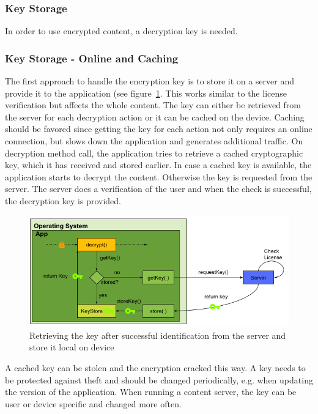 \subsubsection{Key Storage} \label{section:counter-replace-encryption-key}
In order to use encrypted content, a decryption key is needed.

\subsubsection{Key Storage - Online and Caching} \label{section:counter-replace-encryption-key-online}
The first approach to handle the encryption key is to store it on a server and provide it to the application (see figure~\ref{fig:encryptionKeyServer}.
This works similar to the license verification but affects the whole content.
\newline
The key can either be retrieved from the server for each decryption action or it can be cached on the device.
Caching should be favored since getting the key for each action not only requires an online connection, but slows down the application and generates additional traffic.
\newline
On decryption method call, the application tries to retrieve a cached cryptographic key, which it has received and stored earlier.
In case a cached key is available, the application starts to decrypt the content.
Otherwise the key is requested from the server.
The server does a verification of the user and when the check is successful, the decryption key is provided.
\newline
\begin{figure}[h]
    \centering
    \includegraphics[width=1\textwidth]{data/encryptionKeyServer.png}
    \caption{Retrieving the key after successful identification from the server and store it local on device}
    \label{fig:encryptionKeyServer}
\end{figure}
\newline
A cached key can be stolen \cite{memoryDump} and the encryption cracked this way.
A key needs to be protected against theft and should be changed periodically, e.g. when updating the version of the application.
When running a content server, the key can be user or device specific and changed more often.

